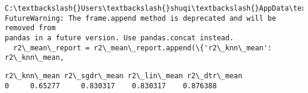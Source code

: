 \documentclass[11pt]{article}
\makeatletter
\newcommand{\boxspacing}{\kern\kvtcb@left@rule\kern\kvtcb@boxsep}
\newcommand{\prompt}[4]{
        {\ttfamily\llap{{\color{#2}[#3]:\hspace{3pt}#4}}\vspace{-\baselineskip}}
    }
\makeatother
\begin{document}
    \begin{Verbatim}[commandchars=\\\{\}]
C:\textbackslash{}Users\textbackslash{}shuqi\textbackslash{}AppData\textbackslash{}Local\textbackslash{}Temp\textbackslash{}ipykernel\_10424\textbackslash{}4161368561.py:9:
FutureWarning: The frame.append method is deprecated and will be removed from
pandas in a future version. Use pandas.concat instead.
  r2\_mean\_report = r2\_mean\_report.append(\{'r2\_knn\_mean': r2\_knn\_mean,
    \end{Verbatim}

            \begin{tcolorbox}[breakable, size=fbox, boxrule=.5pt, pad at break*=1mm, opacityfill=0]
\prompt{Out}{outcolor}{95}{\boxspacing}
\begin{Verbatim}[commandchars=\\\{\}]
  r2\_knn\_mean r2\_sgdr\_mean r2\_lin\_mean r2\_dtr\_mean
0     0.65277     0.830317    0.830317    0.876388
\end{Verbatim}
\end{tcolorbox}
        
\end{document}
